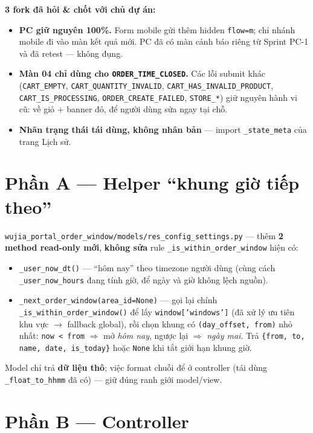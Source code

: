 \textbf{3 fork đã hỏi \& chốt với chủ dự án:}
\begin{itemize}
  \item \textbf{PC giữ nguyên 100\%.} Form mobile gửi thêm hidden \texttt{flow=m}; chỉ nhánh mobile
    đi vào màn kết quả mới. PC đã có màn cảnh báo riêng từ Sprint PC-1 và đã retest --- không đụng.
  \item \textbf{Màn 04 chỉ dùng cho \texttt{ORDER\_TIME\_CLOSED}.} Các lỗi submit khác
    (\texttt{CART\_EMPTY}, \texttt{CART\_QUANTITY\_INVALID}, \texttt{CART\_HAS\_INVALID\_PRODUCT},
    \texttt{CART\_IS\_PROCESSING}, \texttt{ORDER\_CREATE\_FAILED}, \texttt{STORE\_*}) giữ nguyên
    hành vi cũ: về giỏ + banner đỏ, để người dùng sửa ngay tại chỗ.
  \item \textbf{Nhãn trạng thái tái dùng, không nhân bản} --- import \texttt{\_state\_meta} của
    trang Lịch sử.
\end{itemize}

\section{Phần A --- Helper ``khung giờ tiếp theo''}

\texttt{wujia\_portal\_order\_window/models/res\_config\_settings.py} --- thêm \textbf{2 method
read-only mới}, \textbf{không sửa} rule \texttt{\_is\_within\_order\_window} hiện có:

\begin{itemize}
  \item \texttt{\_user\_now\_dt()} --- ``hôm nay'' theo timezone người dùng (cùng cách
    \texttt{\_user\_now\_hours} đang tính giờ, để ngày và giờ không lệch nguồn).
  \item \texttt{\_next\_order\_window(area\_id=None)} --- gọi lại chính
    \texttt{\_is\_within\_order\_window()} để lấy \texttt{window['windows']} (đã xử lý ưu tiên
    khu vực $\to$ fallback global), rồi chọn khung có \texttt{(day\_offset, from)} nhỏ nhất:
    \texttt{now < from} $\Rightarrow$ mở \emph{hôm nay}, ngược lại $\Rightarrow$ \emph{ngày mai}.
    Trả \texttt{\{from, to, name, date, is\_today\}} hoặc \texttt{None} khi tắt giới hạn khung giờ.
\end{itemize}

Model chỉ trả \textbf{dữ liệu thô}; việc format chuỗi để ở controller (tái dùng
\texttt{\_float\_to\_hhmm} đã có) --- giữ đúng ranh giới model/view.

\section{Phần B --- Controller}


